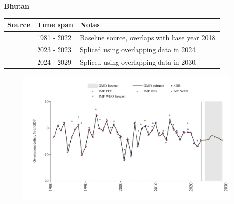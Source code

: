 \documentclass[12pt,a4paper,landscape]{article}
\begin{document}
\begin{adjustbox}{max totalsize={\paperwidth}{\paperheight},center}
\begin{minipage}[t][\textheight][t]{\textwidth}
\vspace*{0.5cm}
{}
\begin{center}
{\Large\bfseries Bhutan}
\end{center}
\vspace{0.5cm}
\begin{table}[H]
\centering
\small
\begin{tabular}{|l|l|l|}
\hline
\textbf{Source} & \textbf{Time span} & \textbf{Notes} \\
\hline
\rowcolor{white}\cite{IMF_WEO}& 1981 - 2022 &Baseline source, overlaps with base year 2018.\\
\rowcolor{lightgray}\cite{IMF_FPP}& 2023 - 2023 &Spliced using overlapping data in 2024.\\
\rowcolor{white}\cite{IMF_WEO_forecast}& 2024 - 2029 &Spliced using overlapping data in 2030.\\
\hline
\end{tabular}
\end{table}
\begin{figure}[H]
\centering
\includegraphics[width=\textwidth,height=0.6\textheight,keepaspectratio]{graphs/BTN_govdef_GDP.pdf}
\end{figure}
\end{minipage}
\end{adjustbox}
\end{document}
